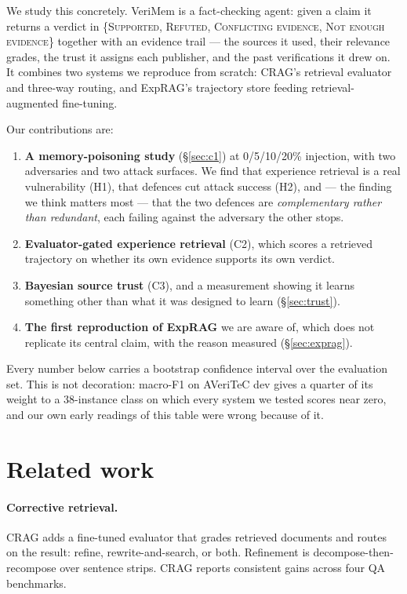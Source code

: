 \documentclass[11pt]{article}
\begin{document}
We study this concretely. VeriMem is a fact-checking agent: given a claim it
returns a verdict in \{\textsc{Supported}, \textsc{Refuted}, \textsc{Conflicting
evidence}, \textsc{Not enough evidence}\} together with an evidence trail ---
the sources it used, their relevance grades, the trust it assigns each
publisher, and the past verifications it drew on. It combines two systems we
reproduce from scratch: CRAG's retrieval evaluator and three-way routing, and
ExpRAG's trajectory store feeding retrieval-augmented fine-tuning.

Our contributions are:

\begin{enumerate}
\itemsep0em
\item \textbf{A memory-poisoning study} (\S\ref{sec:c1}) at 0/5/10/20\%
  injection, with two adversaries and two attack surfaces. We find that
  experience retrieval is a real vulnerability (H1), that defences cut attack
  success (H2), and --- the finding we think matters most --- that the two
  defences are \emph{complementary rather than redundant}, each failing against
  the adversary the other stops.
\item \textbf{Evaluator-gated experience retrieval} (C2), which scores a
  retrieved trajectory on whether its own evidence supports its own verdict.
\item \textbf{Bayesian source trust} (C3), and a measurement showing it learns
  something other than what it was designed to learn (\S\ref{sec:trust}).
\item \textbf{The first reproduction of ExpRAG} we are aware of, which does not
  replicate its central claim, with the reason measured (\S\ref{sec:exprag}).
\end{enumerate}

Every number below carries a bootstrap confidence interval over the evaluation
set. This is not decoration: macro-F1 on AVeriTeC dev gives a quarter of its
weight to a 38-instance class on which every system we tested scores near zero,
and our own early readings of this table were wrong because of it.

\section{Related work}

\paragraph{Corrective retrieval.} CRAG \citep{yan2024crag} adds a fine-tuned
evaluator that grades retrieved documents and routes on the result: refine,
rewrite-and-search, or both. Refinement is decompose-then-recompose over
sentence strips. CRAG reports consistent gains across four QA benchmarks.
\end{document}
